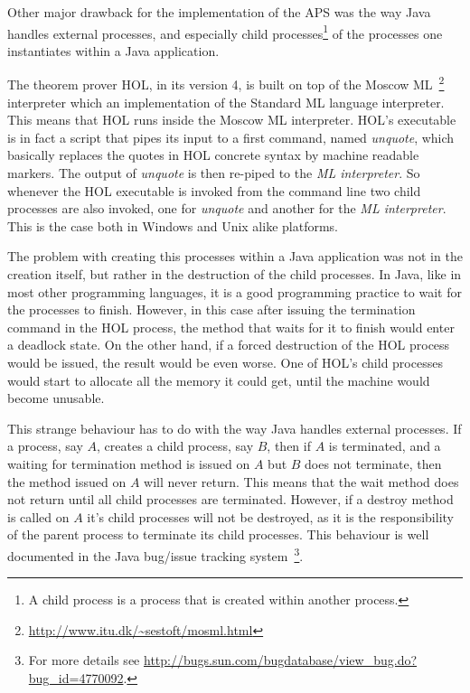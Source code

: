 \documentclass[]{article}
\begin{document}
Other major drawback for the implementation of the APS was the way Java handles external processes, and especially child processes\footnote{A child process is a process that is created within another process.} of the processes one instantiates within a Java application.

The theorem prover HOL, in its version 4, is built on top of the Moscow ML~\footnote{\url{http://www.itu.dk/~sestoft/mosml.html}} interpreter which an implementation of the Standard ML language interpreter.
This means that HOL runs inside the Moscow ML interpreter.
HOL's executable is in fact a script that pipes its input to a first command, named \emph{unquote}, which basically replaces the quotes in HOL concrete syntax by machine readable markers.
The output of \emph{unquote} is then re-piped to the \emph{ML interpreter}.
So whenever the HOL executable is invoked from the command line two child processes are also invoked, one for \emph{unquote} and another for the \emph{ML interpreter}.
This is the case both in Windows and Unix alike platforms.

The problem with creating this processes within a Java application was not in the creation itself, but rather in the destruction of the child processes.
In Java, like in most other programming languages, it is a good programming practice to wait for the processes to finish.
However, in this case after issuing the termination command in the HOL process, the method that waits for it to finish would enter a deadlock state.
On the other hand, if a forced destruction of the HOL process would be issued, the result would be even worse.
One of HOL's child processes would start to allocate all the memory it could get, until the machine would become unusable.

This strange behaviour has to do with the way Java handles external processes.
If a process, say $A$, creates a child process, say $B$, then if $A$ is terminated, and a waiting for termination method is issued on $A$ but $B$ does not terminate, then the method issued on $A$ will never return.
This means that the wait method does not return until all child processes are terminated.
However, if a destroy method is called on $A$ it's child processes will not be destroyed, as it is the responsibility of the parent process to terminate its child processes.
This behaviour is well documented in the Java bug/issue tracking system~\footnote{For more details see \url{http://bugs.sun.com/bugdatabase/view_bug.do?bug_id=4770092}.}.
\end{document}
